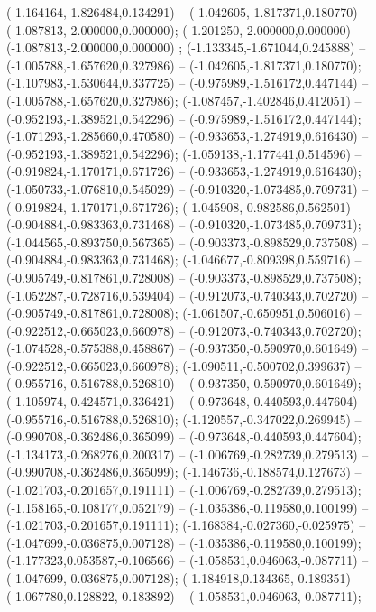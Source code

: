  (-1.164164,-1.826484,0.134291) -- (-1.042605,-1.817371,0.180770) -- (-1.087813,-2.000000,0.000000);
 (-1.201250,-2.000000,0.000000) -- (-1.087813,-2.000000,0.000000) ;
 (-1.133345,-1.671044,0.245888) -- (-1.005788,-1.657620,0.327986) -- (-1.042605,-1.817371,0.180770);
 (-1.107983,-1.530644,0.337725) -- (-0.975989,-1.516172,0.447144) -- (-1.005788,-1.657620,0.327986);
 (-1.087457,-1.402846,0.412051) -- (-0.952193,-1.389521,0.542296) -- (-0.975989,-1.516172,0.447144);
 (-1.071293,-1.285660,0.470580) -- (-0.933653,-1.274919,0.616430) -- (-0.952193,-1.389521,0.542296);
 (-1.059138,-1.177441,0.514596) -- (-0.919824,-1.170171,0.671726) -- (-0.933653,-1.274919,0.616430);
 (-1.050733,-1.076810,0.545029) -- (-0.910320,-1.073485,0.709731) -- (-0.919824,-1.170171,0.671726);
 (-1.045908,-0.982586,0.562501) -- (-0.904884,-0.983363,0.731468) -- (-0.910320,-1.073485,0.709731);
 (-1.044565,-0.893750,0.567365) -- (-0.903373,-0.898529,0.737508) -- (-0.904884,-0.983363,0.731468);
 (-1.046677,-0.809398,0.559716) -- (-0.905749,-0.817861,0.728008) -- (-0.903373,-0.898529,0.737508);
 (-1.052287,-0.728716,0.539404) -- (-0.912073,-0.740343,0.702720) -- (-0.905749,-0.817861,0.728008);
 (-1.061507,-0.650951,0.506016) -- (-0.922512,-0.665023,0.660978) -- (-0.912073,-0.740343,0.702720);
 (-1.074528,-0.575388,0.458867) -- (-0.937350,-0.590970,0.601649) -- (-0.922512,-0.665023,0.660978);
 (-1.090511,-0.500702,0.399637) -- (-0.955716,-0.516788,0.526810) -- (-0.937350,-0.590970,0.601649);
 (-1.105974,-0.424571,0.336421) -- (-0.973648,-0.440593,0.447604) -- (-0.955716,-0.516788,0.526810);
 (-1.120557,-0.347022,0.269945) -- (-0.990708,-0.362486,0.365099) -- (-0.973648,-0.440593,0.447604);
 (-1.134173,-0.268276,0.200317) -- (-1.006769,-0.282739,0.279513) -- (-0.990708,-0.362486,0.365099);
 (-1.146736,-0.188574,0.127673) -- (-1.021703,-0.201657,0.191111) -- (-1.006769,-0.282739,0.279513);
 (-1.158165,-0.108177,0.052179) -- (-1.035386,-0.119580,0.100199) -- (-1.021703,-0.201657,0.191111);
 (-1.168384,-0.027360,-0.025975) -- (-1.047699,-0.036875,0.007128) -- (-1.035386,-0.119580,0.100199);
 (-1.177323,0.053587,-0.106566) -- (-1.058531,0.046063,-0.087711) -- (-1.047699,-0.036875,0.007128);
 (-1.184918,0.134365,-0.189351) -- (-1.067780,0.128822,-0.183892) -- (-1.058531,0.046063,-0.087711);
